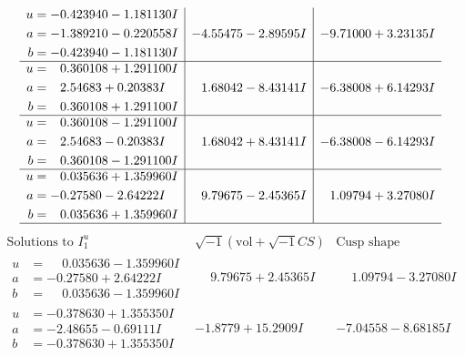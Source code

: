 \documentclass[1p]{elsarticle_modified}
\theoremstyle{definition}
\newcommand{\I}{\sqrt{-1}}
\begin{document}
$$\begin{array}{c|c|c}
\begin{aligned}
u &= -0.423940 - 1.181130 I \\
a &= -1.389210 - 0.220558 I \\
b &= -0.423940 - 1.181130 I\end{aligned}
 & -4.55475 - 2.89595 I & -9.71000 + 3.23135 I \\ \hline\begin{aligned}
u &= \phantom{-}0.360108 + 1.291100 I \\
a &= \phantom{-}2.54683 + 0.20383 I \\
b &= \phantom{-}0.360108 + 1.291100 I\end{aligned}
 & \phantom{-}1.68042 - 8.43141 I & -6.38008 + 6.14293 I \\ \hline\begin{aligned}
u &= \phantom{-}0.360108 - 1.291100 I \\
a &= \phantom{-}2.54683 - 0.20383 I \\
b &= \phantom{-}0.360108 - 1.291100 I\end{aligned}
 & \phantom{-}1.68042 + 8.43141 I & -6.38008 - 6.14293 I \\ \hline\begin{aligned}
u &= \phantom{-}0.035636 + 1.359960 I \\
a &= -0.27580 - 2.64222 I \\
b &= \phantom{-}0.035636 + 1.359960 I\end{aligned}
 & \phantom{-}9.79675 - 2.45365 I & \phantom{-}1.09794 + 3.27080 I\\
 \hline 
 \end{array}$$\newpage$$\begin{array}{c|c|c}  
\text{Solutions to }I^u_{1}& \I (\text{vol} + \sqrt{-1}CS) & \text{Cusp shape}\\
 \hline 
\begin{aligned}
u &= \phantom{-}0.035636 - 1.359960 I \\
a &= -0.27580 + 2.64222 I \\
b &= \phantom{-}0.035636 - 1.359960 I\end{aligned}
 & \phantom{-}9.79675 + 2.45365 I & \phantom{-}1.09794 - 3.27080 I \\ \hline\begin{aligned}
u &= -0.378630 + 1.355350 I \\
a &= -2.48655 - 0.69111 I \\
b &= -0.378630 + 1.355350 I\end{aligned}
 & -1.8779 + 15.2909 I & -7.04558 - 8.68185 I \\ \hline\begin{aligned}

\end{aligned}
\end{array}$$
\end{document}
